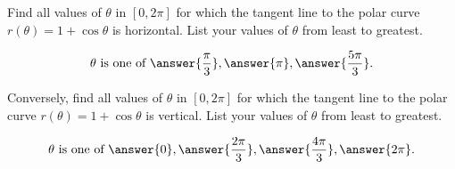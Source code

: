 \documentclass{ximera}
\author{Gregory Hartman \and Matthew Carr}
\begin{document}
\begin{exercise}





Find all values of $\theta$ in $[0,2\pi]$ for which the tangent line
to the polar curve $r(\theta)=1+\cos\theta$ is horizontal. List your
values of $\theta$ from least to greatest.

\begin{prompt}
  \[
  \text{$\theta$ is one of }\answer{\frac{\pi}{3}}, \answer{\pi}, \answer{\frac{5\pi}{3}}\ldotp
  \]
\end{prompt}

Conversely, find all values of $\theta$ in $[0,2\pi]$ for which the
tangent line to the polar curve $r(\theta)=1+\cos\theta$ is
vertical. List your values of $\theta$ from least to greatest.
\begin{prompt}
  \[
  \text{$\theta$ is one of } \answer{0}, \answer{\frac{2\pi}{3}}, \answer{\frac{4\pi}{3}}, \answer{2\pi}\ldotp
  \]
\end{prompt}

 
\end{exercise}
\end{document}
